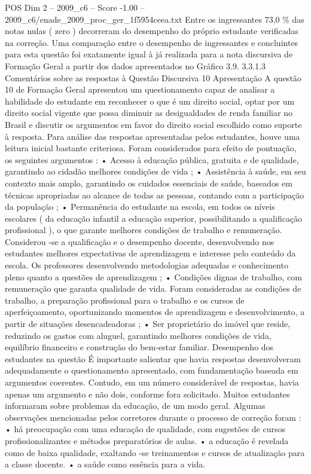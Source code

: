 \begin{textsample}{POS Dim 2 – 2009\_c6 – Score -1.00 – 2009\_c6/enade\_2009\_proc\_ger\_1f5954ceea.txt}
Entre os ingressantes 73,0 \% das notas nulas ( zero ) decorreram do desempenho do próprio estudante verificadas na correção.
Uma comparação entre o desempenho de ingressantes e concluintes para esta questão foi exatamente igual à já realizada para a nota discursiva de Formação Geral a partir dos dados apresentados no Gráfico 3.9. 3.3.1.3 Comentários sobre as respostas à Questão Discursiva 10 Apresentação A questão 10 de Formação Geral apresentou um questionamento capaz de analisar a habilidade do estudante em reconhecer o que é um direito social, optar por um direito social vigente que possa diminuir as desigualdades de renda familiar no Brasil e discutir os argumentos em favor do direito social escolhido como suporte à resposta.
Para análise das respostas apresentadas pelos estudantes, houve uma leitura inicial bastante criteriosa.
Foram considerados para efeito de pontuação, os seguintes argumentos : • Acesso à educação pública, gratuita e de qualidade, garantindo ao cidadão melhores condições de vida ; • Assistência à saúde, em seu contexto mais amplo, garantindo os cuidados essenciais de saúde, baseados em técnicas apropriadas ao alcance de todas as pessoas, contando com a participação da população ; • Permanência do estudante na escola, em todos os níveis escolares ( da educação infantil a educação superior, possibilitando a qualificação profissional ), o que garante melhores condições de trabalho e remuneração.
Considerou -se a qualificação e o desempenho docente, desenvolvendo nos estudantes melhores expectativas de aprendizagem e interesse pelo conteúdo da escola.
Os professores desenvolvendo metodologias adequadas e conhecimento pleno quanto a questões de aprendizagem ; • Condições dignas de trabalho, com remuneração que garanta qualidade de vida.
Foram consideradas as condições de trabalho, a preparação profissional para o trabalho e os cursos de aperfeiçoamento, oportunizando momentos de aprendizagem e desenvolvimento, a partir de situações desencadeadoras ; • Ser proprietário do imóvel que reside, reduzindo os gastos com aluguel, garantindo melhores condições de vida, equilíbrio financeiro e construção do bem-estar familiar.
Desempenho dos estudantes na questão É importante salientar que havia respostas desenvolveram adequadamente o questionamento apresentado, com fundamentação baseada em argumentos coerentes.
Contudo, em um número considerável de respostas, havia apenas um argumento e não dois, conforme fora solicitado.
Muitos estudantes informaram sobre problemas da educação, de um modo geral.
Algumas observações mencionadas pelos corretores durante o processo de correção foram : • há preocupação com uma educação de qualidade, com sugestões de cursos profissionalizantes e métodos preparatórios de aulas. • a educação é revelada como de baixa qualidade, exaltando -se treinamentos e cursos de atualização para a classe docente. • a saúde como essência para a vida.

\end{textsample}
